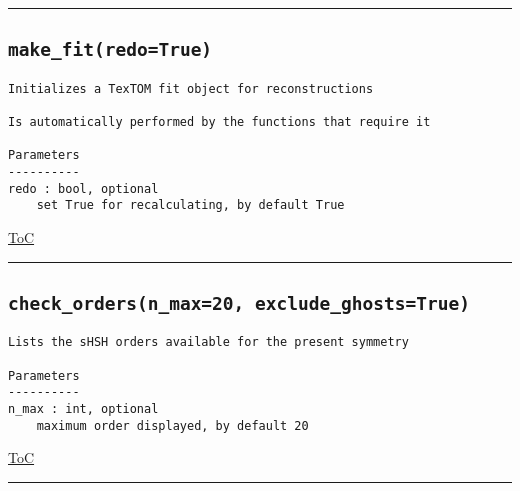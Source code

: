 \documentclass{article}
\begin{document}


\vspace{5mm}

\hrule

\subsection*{\texttt{make\_fit(redo=True)}}
\label{fun:makefit}

\begin{lstlisting}[language=docstring]
Initializes a TexTOM fit object for reconstructions

Is automatically performed by the functions that require it

Parameters
----------
redo : bool, optional
    set True for recalculating, by default True
\end{lstlisting}

\begin{flushright}

\hyperref[toc]{ToC}

\end{flushright}



\vspace{5mm}

\hrule

\subsection*{\texttt{check\_orders(n\_max=20, exclude\_ghosts=True)}}
\label{fun:checkorders}

\begin{lstlisting}[language=docstring]
Lists the sHSH orders available for the present symmetry

Parameters
----------
n_max : int, optional
    maximum order displayed, by default 20
\end{lstlisting}

\begin{flushright}

\hyperref[toc]{ToC}

\end{flushright}



\vspace{5mm}

\hrule
\end{document}
